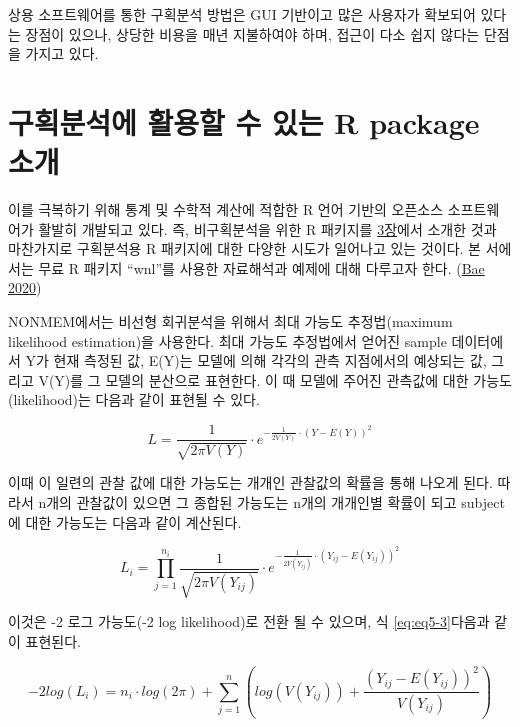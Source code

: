 \documentclass[
  11pt,
  krantz2, a4paper, twoside]{krantz}
\theoremstyle{definition}
\theoremstyle{definition}
\theoremstyle{definition}
\theoremstyle{definition}
\theoremstyle{remark}
\begin{document}
상용 소프트웨어를 통한 구획분석 방법은 GUI 기반이고 많은 사용자가 확보되어 있다는 장점이 있으나, 상당한 비용을 매년 지불하여야 하며, 접근이 다소 쉽지 않다는 단점을 가지고 있다.

\hypertarget{uxad6cuxd68duxbd84uxc11duxc5d0-uxd65cuxc6a9uxd560-uxc218-uxc788uxb294-r-package-uxc18cuxac1c}{%
\section{구획분석에 활용할 수 있는 R package 소개}\label{uxad6cuxd68duxbd84uxc11duxc5d0-uxd65cuxc6a9uxd560-uxc218-uxc788uxb294-r-package-uxc18cuxac1c}}

이를 극복하기 위해 통계 및 수학적 계산에 적합한 R 언어 기반의 오픈소스 소프트웨어가 활발히 개발되고 있다.
즉, 비구획분석을 위한 R 패키지를 \protect\hyperlink{nca-analysis}{3장}에서 소개한 것과 마찬가지로 구획분석용 R 패키지에 대한 다양한 시도가 일어나고 있는 것이다.
본 서에서는 무료 R 패키지 ``wnl''를 사용한 자료해석과 예제에 대해 다루고자 한다. (\protect\hyperlink{ref-R-wnl}{Bae 2020})

NONMEM에서는 비선형 회귀분석을 위해서 최대 가능도 추정법(maximum likelihood estimation)을 사용한다. 
최대 가능도 추정법에서 얻어진 sample 데이터에서 Y가 현재 측정된 값, E(Y)는 모델에 의해 각각의 관측 지점에서의 예상되는 값, 그리고 V(Y)를 그 모델의 분산으로 표현한다. 
이 때 모델에 주어진 관측값에 대한 가능도(likelihood)는 다음과 같이 표현될 수 있다.

\begin{equation}
L = \frac{1}{\sqrt{2\pi V(Y)}} \cdot e^{-\frac{1}{2V(Y)}\cdot(Y-E(Y))^2}
\label{eq:eq5-1}
\end{equation}

이때 이 일련의 관찰 값에 대한 가능도는 개개인 관찰값의 확률을 통해 나오게 된다. 
따라서 n개의 관찰값이 있으면 그 종합된 가능도는 n개의 개개인별 확률이 되고 subject에 대한 가능도는 다음과 같이 계산된다.

\begin{equation}
L_i = \prod_{j=1}^{n_i}\frac{1}{\sqrt{2\pi V(Y_{ij})}} \cdot e^{-\frac{1}{2V(Y_{ij})}\cdot(Y_{ij}-E(Y_{ij}))^2}
\label{eq:eq5-2}
\end{equation}

이것은 -2 로그 가능도(-2 log likelihood)로 전환 될 수 있으며, 식 \eqref{eq:eq5-3}다음과 같이 표현된다.

\begin{equation}
-2log(L_i) = n_i \cdot log(2\pi) + \sum_{j=1}^{n}(log(V(Y_{ij}))+ \frac{(Y_{ij} - E(Y_{ij}))^2}{V(Y_{ij})})
\label{eq:eq5-3}
\end{equation}
\end{document}
